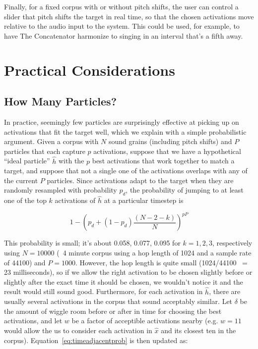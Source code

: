 \documentclass{article}
\begin{document}
Finally, for a fixed corpus with or without pitch shifts, the user can control a slider that pitch shifts the target in real time, so that the chosen activations move relative to the audio input to the system.  This could be used, for example, to have The Concatenator harmonize to singing in an interval that's a fifth away.

\section{Practical Considerations}

\subsection{How Many Particles?}
\label{sec:activationprob}

In practice, seemingly few particles are surprisingly effective at picking up on activations that fit the target well, which we explain with a simple probabilistic argument.  Given a corpus with $N$ sound grains (including pitch shifts) and $P$ particles that each capture $p$ activations, suppose that we have a hypothetical ``ideal particle'' $\hat{h}$ with the $p$ best activations that work together to match a target, and suppose that not a single one of the activations overlaps with any of the current $P$ particles.  Since activations adapt to the target when they are randomly resampled with probability $p_d$, the probability of jumping to at least one of the top $k$ activations of $\hat{h}$ at a particular timestep is 

\begin{equation}
    \label{eq:timeadjacentprob}
    1 - \left( p_d + (1-p_d) \frac{(N-2-k)}{N} \right)^{pP}
\end{equation}

This probability is small; it's about 0.058, 0.077, 0.095 for $k = 1, 2, 3$, respectively using $N=10000$ (~4 minute corpus using a hop length of 1024 and a sample rate of 44100) and $P=1000$.  However, the hop length is quite small (1024/44100 ~= 23 milliseconds), so if we allow the right activation to be chosen slightly before or slightly after the exact time it should be chosen, we wouldn't notice it and the result would still sound good.  Furthermore, for each activation in $\hat{h}$, there are usually several activations in the corpus that sound acceptably similar.  Let $\delta$ be the amount of wiggle room before or after in time for choosing the best activations, and let $w$ be a factor of acceptible activations nearby (e.g. $w=11$ would allow the us to consider each activation in $\hat{x}$ and its closest ten in the corpus).  Equation~\ref{eq:timeadjacentprob} is then updated as:
\end{document}
